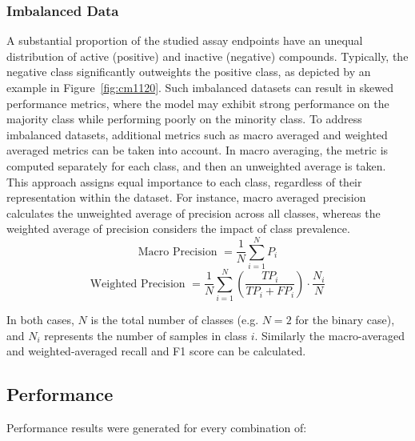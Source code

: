 \subsubsection{Imbalanced Data}
A substantial proportion of the studied assay endpoints have an unequal distribution of active (positive) and inactive (negative) compounds. Typically, the negative class significantly outweights the positive class, as depicted by an example in Figure~\ref{fig:cm1120}. Such imbalanced datasets can result in skewed performance metrics, where the model may exhibit strong performance on the majority class while performing poorly on the minority class. To address imbalanced datasets, additional metrics such as macro averaged and weighted averaged metrics can be taken into account.
In macro averaging, the metric is computed separately for each class, and then an unweighted average is taken. This approach assigns equal importance to each class, regardless of their representation within the dataset. For instance, macro averaged precision calculates the unweighted average of precision across all classes, whereas the weighted average of precision considers the impact of class prevalence.
\[ \text{Macro Precision } = \frac{1}{N} \sum_{i=1}^{N} P_i \] 
\[ \text{Weighted Precision } = \frac{1}{N} \sum_{i=1}^{N} \left(\frac{TP_i}{TP_i + FP_i}\right) \cdot \frac{N_i}{N} \]

In both cases, $N$ is the total number of classes (e.g. $N=2$ for the binary case), and $N_i$ represents the number of samples in class $i$. Similarly the macro-averaged and weighted-averaged recall and F1 score can be calculated.


\subsection{Performance}

Performance results were generated for every combination of:

